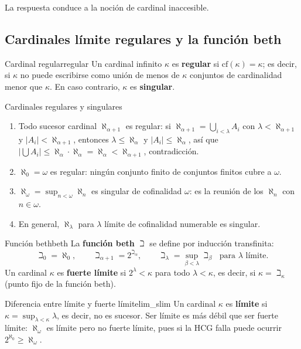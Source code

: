 La respuesta conduce a la noción de cardinal inaccesible.

\subsection{Cardinales límite regulares y la función beth}

\begin{definicion}{Cardinal regular}{regular}
Un cardinal infinito $\kappa$ es \textbf{regular} si $\mathrm{cf}(\kappa) = \kappa$; es decir, si $\kappa$ no puede escribirse como unión de menos de $\kappa$ conjuntos de cardinalidad menor que $\kappa$. En caso contrario, $\kappa$ es \textbf{singular}.
\end{definicion}

\begin{ejemplo}{Cardinales regulares y singulares}{}
\begin{enumerate}[leftmargin=2em, label=(\alph*)]
  \item Todo sucesor cardinal $\aleph_{\alpha+1}$ es regular: si $\aleph_{\alpha+1} = \bigcup_{i < \lambda} A_i$ con $\lambda < \aleph_{\alpha+1}$ y $|A_i| < \aleph_{\alpha+1}$, entonces $\lambda \leq \aleph_\alpha$ y $|A_i| \leq \aleph_\alpha$, así que $|\bigcup A_i| \leq \aleph_\alpha \cdot \aleph_\alpha = \aleph_\alpha < \aleph_{\alpha+1}$, contradicción.
  \item $\aleph_0 = \omega$ es regular: ningún conjunto finito de conjuntos finitos cubre a $\omega$.
  \item $\aleph_\omega = \sup_{n < \omega} \aleph_n$ es singular de cofinalidad $\omega$: es la reunión de los $\aleph_n$ con $n \in \omega$.
  \item En general, $\aleph_\lambda$ para $\lambda$ límite de cofinalidad numerable es singular.
\end{enumerate}
\end{ejemplo}

\begin{definicion}{Función beth}{beth}
La \textbf{función beth} $\beth$ se define por inducción transfinita:
\[
  \beth_0 = \aleph_0, \qquad \beth_{\alpha+1} = 2^{\beth_\alpha}, \qquad \beth_\lambda = \sup_{\beta < \lambda} \beth_\beta \;\text{ para } \lambda \text{ límite.}
\]
Un cardinal $\kappa$ es \textbf{fuerte límite} si $2^\lambda < \kappa$ para todo $\lambda < \kappa$, es decir, si $\kappa = \beth_\kappa$ (punto fijo de la función beth).
\end{definicion}

\begin{observacion}{Diferencia entre límite y fuerte límite}{lim_slim}
Un cardinal $\kappa$ es \textbf{límite} si $\kappa = \sup_{\lambda < \kappa} \lambda$, es decir, no es sucesor. Ser límite es más débil que ser fuerte límite: $\aleph_\omega$ es límite pero no fuerte límite, pues si la HCG falla puede ocurrir $2^{\aleph_0} \geq \aleph_\omega$.
\end{observacion}

